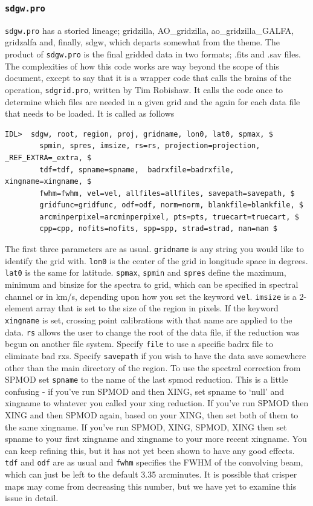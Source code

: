 \documentclass[11pt]{article}
\begin{document}
{\subsubsection{\texttt{sdgw.pro}}
\texttt{sdgw.pro} has a storied lineage; gridzilla, AO\_gridzilla, ao\_gridzilla\_GALFA, gridzalfa and, finally, sdgw, which departs somewhat from the theme. The product of \texttt{sdgw.pro} is the final gridded data in two formats; .fits and .sav files. The complexities of how this code works are way beyond the scope of this document, except to say that it is a wrapper code that calls the brains of the operation, \texttt{sdgrid.pro}, written by Tim Robishaw. It calls the code once to determine which files are needed in a given grid and the again for each data file that needs to be loaded. It is called as follows
\begin{verbatim}
IDL>  sdgw, root, region, proj, gridname, lon0, lat0, spmax, $
        spmin, spres, imsize, rs=rs, projection=projection, _REF_EXTRA=_extra, $
        tdf=tdf, spname=spname,  badrxfile=badrxfile, xingname=xingname, $
        fwhm=fwhm, vel=vel, allfiles=allfiles, savepath=savepath, $
        gridfunc=gridfunc, odf=odf, norm=norm, blankfile=blankfile, $
        arcminperpixel=arcminperpixel, pts=pts, truecart=truecart, $
        cpp=cpp, nofits=nofits, spp=spp, strad=strad, nan=nan $
\end{verbatim}
The first three parameters are as usual. \texttt{gridname} is any string you would like to identify the grid with. \texttt{lon0} is the center of the grid in longitude space in degrees. \texttt{lat0} is the same for latitude. \texttt{spmax}, \texttt{spmin} and \texttt{spres} define the maximum, minimum and binsize for the spectra to grid, which can be specified in spectral channel or in km/s, depending upon how you set the keyword \texttt{vel}. \texttt{imsize} is a 2-element array that is set to the size of the region in pixels. If the keyword \texttt{xingname} is set, crossing point calibrations with that name are applied to the data. \texttt{rs} allows the user to change the root of the data file, if the reduction was begun on another file system. Specify \texttt{file} to use a specific badrx file to eliminate bad rxs. Specify \texttt{savepath} if you wish to have the data save somewhere other than the main directory of the region. To use the spectral correction from SPMOD set \texttt{spname} to the name of the last spmod reduction. This is a little confusing - if you've run SPMOD and then XING, set spname to `null' and xingname to whatever you called your xing reduction. If you've run SPMOD then XING and then SPMOD again, based on your XING, then set both of them to the same xingname. If you've run SPMOD, XING, SPMOD, XING then set spname to your first xingname and xingname to your more recent xingname. You can keep refining this, but it has not yet been shown to have any good effects. \texttt{tdf} and \texttt{odf} are as usual and \texttt{fwhm} specifies the FWHM of the convolving beam, which can just be left to the default 3.35 arcminutes. It is possible that crisper maps may come from decreasing this number, but we have yet to examine this issue in detail. 

}
\end{document}
